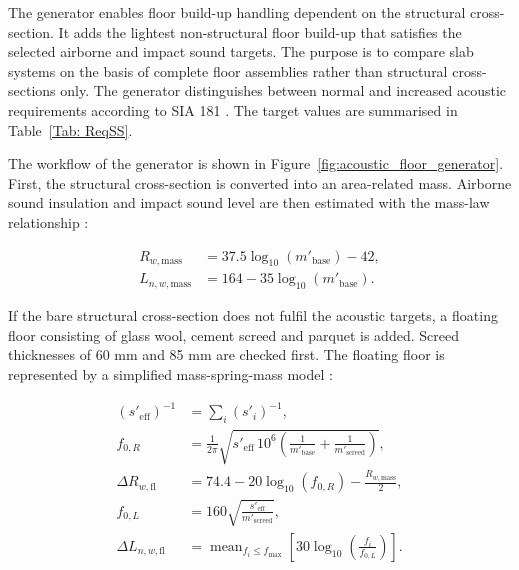 The generator enables floor build-up handling dependent on the structural cross-section. It adds the lightest non-structural floor build-up that satisfies the selected airborne and impact sound targets. The purpose is to compare slab systems on the basis of complete floor assemblies rather than structural cross-sections only. The generator distinguishes between normal and increased acoustic requirements according to SIA 181 \cite{SIA181_2020}. The target values are summarised in Table~\ref{Tab: ReqSS}.

The workflow of the generator is shown in Figure~\ref{fig:acoustic_floor_generator}. First, the structural cross-section is converted into an area-related mass. Airborne sound insulation and impact sound level are then estimated with the mass-law relationship \cite{BauphysikKalender, ISO12354_1_2017, ISO12354_2_2017}:

\begin{equation}
\begin{aligned}
R_{w,\mathrm{mass}} &= 37.5 \log_{10}(m'_{\mathrm{base}}) - 42,\\
L_{n,w,\mathrm{mass}} &= 164 - 35 \log_{10}(m'_{\mathrm{base}}).
\end{aligned}
\end{equation}

If the bare structural cross-section does not fulfil the acoustic targets, a floating floor consisting of glass wool, cement screed and parquet is added. Screed thicknesses of 60 mm and 85 mm are checked first. The floating floor is represented by a simplified mass-spring-mass model \cite{BauphysikKalender, ISO12354_1_2017, ISO12354_2_2017}:

\begin{equation}
\begin{aligned}
(s'_{\mathrm{eff}})^{-1}
&=
\sum_i (s'_i)^{-1},\\
f_{0,R} &=
\frac{1}{2\pi}
\sqrt{
s'_{\mathrm{eff}}\,10^6
\left(
\frac{1}{m'_{\mathrm{base}}}
+
\frac{1}{m'_{\mathrm{screed}}}
\right)
},\\
\Delta R_{w,\mathrm{fl}} &=
74.4 - 20\log_{10}(f_{0,R}) - \frac{R_{w,\mathrm{mass}}}{2},\\
f_{0,L} &=
160\sqrt{\frac{s'_{\mathrm{eff}}}{m'_{\mathrm{screed}}}},\\
\Delta L_{n,w,\mathrm{fl}} &=
\operatorname{mean}_{f_i \leq f_{\max}}
\left[
30\log_{10}
\left(
\frac{f_i}{f_{0,L}}
\right)
\right].
\end{aligned}
\end{equation}

